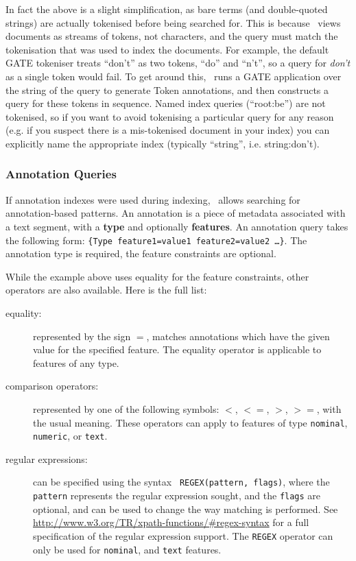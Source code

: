 In fact the above is a slight simplification, as bare terms (and double-quoted
strings) are actually tokenised before being searched for.  This is because
\Mimir\ views documents as streams of tokens, not characters, and the query
must match the tokenisation that was used to index the documents.  For example,
the default GATE tokeniser treats ``don't'' as two tokens, ``do'' and ``n't'',
so a query for {\em don't} as a single token would fail.  To get around this,
\Mimir\ runs a GATE application over the string of the query to generate
Token annotations, and then constructs a query for these tokens in sequence.  
Named index queries (``root:be'') are
not tokenised, so if you want to avoid tokenising a particular query for any
reason (e.g. if you suspect there is a mis-tokenised document in your index)
you can explicitly name the appropriate index (typically ``string'', i.e.
string:don't).

\subsubsection{Annotation Queries}\label{sec:mimir-search:annotation-query}

If annotation indexes were used during indexing, \Mimir\ allows searching for
annotation-based patterns. An annotation is a piece of metadata
associated with a text segment, with a {\bf type} and optionally
{\bf features}.  An annotation query takes the following form: 
{\tt \{Type feature1=value1 feature2=value2 \ldots\}}.  The annotation type is
required, the feature constraints are optional.

While the example above uses equality for the feature constraints, other
operators are also available. Here is the full list:
\begin{description}
  \item[equality:] represented by the sign $=$, matches annotations which have
  the given value for the specified feature. The equality operator is
  applicable to features of any type.
  \item[comparison operators:] represented by one of the following symbols:
  $<$, $<=$, $>$, $>=$, with the usual meaning. These operators can apply to
  features of type {\tt nominal}, {\tt numeric}, or {\tt text}.
  \item[regular expressions:] can be specified using the syntax {\tt
  REGEX(pattern, flags)}, where the {\tt pattern} represents the regular
  expression sought, and the {\tt flags} are optional, and can be used to
  change the way matching is performed. See
  \url{http://www.w3.org/TR/xpath-functions/#regex-syntax} for a full
  specification of the regular expression support. The {\tt REGEX} operator can
  only be used for {\tt nominal}, and {\tt text} features.
\end{description}

